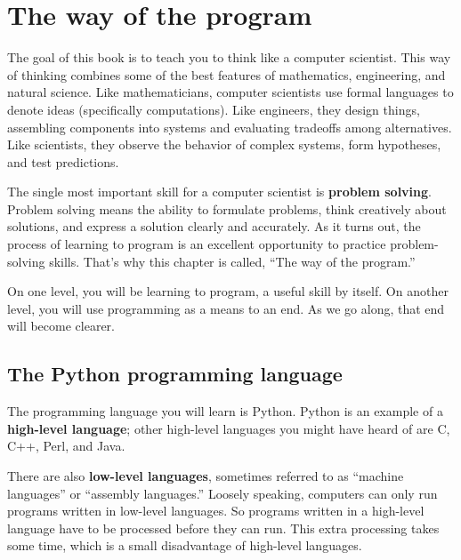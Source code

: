 \documentclass[10pt]{book}
\begin{document}
\normalsize
\clearemptydoublepage

\begin{latexonly}

\tableofcontents

\clearemptydoublepage

\end{latexonly}

\mainmatter

\chapter{The way of the program}

The goal of this book is to teach you to think like a
computer scientist.  This way of thinking combines some of the best features
of mathematics, engineering, and natural science.  Like mathematicians,
computer scientists use formal languages to denote ideas (specifically
computations).  Like engineers, they design things, assembling components
into systems and evaluating tradeoffs among alternatives.  Like scientists,
they observe the behavior of complex systems, form hypotheses, and test
predictions.

The single most important skill for a computer scientist is {\bf
problem solving}.  Problem solving means the ability to formulate
problems, think creatively about solutions, and express a solution clearly
and accurately.  As it turns out, the process of learning to program is an
excellent opportunity to practice problem-solving skills.  That's why
this chapter is called, ``The way of the program.''

On one level, you will be learning to program, a useful
skill by itself.  On another level, you will use programming as a means to
an end.  As we go along, that end will become clearer.

\section{The Python programming language}

The programming language you will learn is Python. Python is
an example of a {\bf high-level language}; other high-level languages
you might have heard of are C, C++, Perl, and Java.

There are
also {\bf low-level languages}, sometimes referred to as ``machine
languages'' or ``assembly languages.''  Loosely speaking, computers
can only run programs written in low-level languages.  So
programs written in a high-level language have to be processed before
they can run.  This extra processing takes some time, which is a small
disadvantage of high-level languages.
\end{document}
